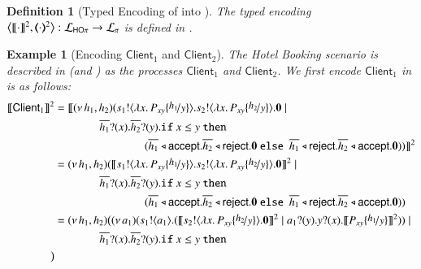 \documentclass[preprint,11pt]{elsarticle}
\newtheorem{definition}{Definition}[section]
\newtheorem{example}{Example}[section]
\newcommand{\accept}{\mathsf{accept}}
\newcommand{\reject}{\mathsf{reject}}
\newcommand{\Client}{\mathsf{Client}}
\begin{document}
{%

\begin{definition}[Typed Encoding of \HOp into \sessp]
\label{d:enc:hopitopi}
The typed encoding 
$\enco{\map{\cdot}^{2}, \mapt{\cdot}^{2} %
}: \tyl{L}_{\HOp} \to \tyl{L}_{\sessp}$  
is defined
in . 
\end{definition}



\begin{example}[Encoding $\Client_1$ and $\Client_2$]
The Hotel Booking scenario is described in 
 (and ) as the \HOp processes $\Client_1$ and $\Client_2$. 
We first encode $\Client_1$ in \sessp is as follows:
	\begin{align*}
		\pmap{\Client_1}{2}   & =  \pmap{\newsp{h_1, h_2}{\bout{s_1}{\abs{x}{P_{xy} \subst{h_1}{y}}} \bout{s_2}{\abs{x}{P_{xy} \subst{h_2}{y}}} \inact \Par  \\
		 & 
		\qquad \qquad\binp{\dual{h_1}}{x} \binp{\dual{h_2}}{y}  \If x \leq y\   \Then
		\\
		 & \qquad\qquad \qquad \qquad (\bsel{\dual{h_1}}{\accept} \bsel{\dual{h_2}}{\reject} \inact \ \Else \ \bsel{\dual{h_1}}{\reject} \bsel{\dual{h_2}}{\accept} \inact )
		}}{2}
		\\
				   & =  \newsp{h_1, h_2}{\pmap{\bout{s_1}{\abs{x}{P_{xy} \subst{h_1}{y}}} \bout{s_2}{\abs{x}{P_{xy} \subst{h_2}{y}}} \inact }{2}\Par  \\
		 & 
		\qquad \qquad\binp{\dual{h_1}}{x} \binp{\dual{h_2}}{y}  \If x \leq y\   \Then
		\\
		 & \qquad\qquad \qquad \qquad (\bsel{\dual{h_1}}{\accept} \bsel{\dual{h_2}}{\reject} \inact \ \Else \ \bsel{\dual{h_1}}{\reject} \bsel{\dual{h_2}}{\accept} \inact )
		}
		\\
		& =  \newspb{h_1, h_2}{\newsp{a_1}{\bout{s_1}{a_1} (\pmap{\bout{s_2}{\abs{x}{P_{xy} \subst{h_2}{y}}} \inact}{2} \Par \binp{a_1}{y} \binp{y}{x} \pmap{P_{xy} \subst{h_1}{y}}{2})} \Par  \\
		 & 
		\qquad \qquad\binp{\dual{h_1}}{x} \binp{\dual{h_2}}{y}  \If x \leq y\   \Then
		\\
}
\end{align*}
\end{example}}
\end{document}
